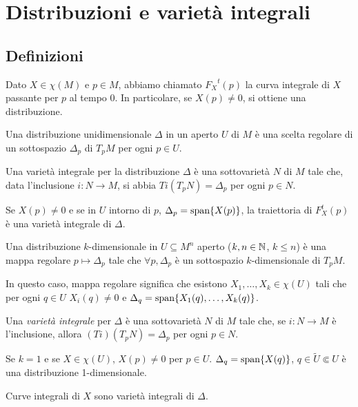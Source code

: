 \chapter{Distribuzioni e varietà integrali}


\section{Definizioni}

Dato $X\in\chi(M)$ e $p\in M$, abbiamo chiamato ${F_X}^t(p)$ la curva integrale di $X$ passante per $p$ al tempo $0$. In particolare, se $X(p)\neq 0$, si ottiene una distribuzione.

\begin{definition}
	Una distribuzione unidimensionale $\Delta$ in un aperto $U$ di $M$ è una scelta regolare di un sottospazio $\Delta_p$ di $T_pM$ per ogni $p\in U$.
\end{definition}

\begin{definition}
	Una varietà integrale per la distribuzione $\Delta$ è una sottovarietà $N$ di $M$ tale che, data l'inclusione $i:N\to M$, si abbia $Ti(T_pN)=\Delta_p$ per ogni $p\in N$.
\end{definition}

Se $X(p)\neq 0$ e se in $U$ intorno di $p$, $\Delta_p=\mathrm{span}\{X(p)\}$, la traiettoria di $F_X^t(p)$ è una varietà integrale di $\Delta$. 


\begin{definition}
	Una distribuzione $k$-dimensionale in $U\subseteq M^n$ aperto ($k,n\in\mathbb N$, $k\le n$) è una mappa regolare  $p\mapsto \Delta_p$ tale che $\forall p, \Delta_p$ è un sottospazio $k$-dimensionale di $T_pM$.
	
	In questo caso, mappa regolare significa che esistono $X_1,\ldots,X_k\in \chi(U)$ tali che per ogni $q\in U$ $X_i(q)\ne 0$ e $\Delta_q=\mathrm{span}\{X_1(q),\ldots,X_k(q)\}$.
\end{definition}

\begin{definition}
	Una \emph{varietà integrale} per $\Delta$ è una sottovarietà $N$ di $M$ tale che, se $i:N\to M$ è l'inclusione,
	allora $(Ti)(T_pN)=\Delta_p$ per ogni $p\in N$.
\end{definition}

\begin{example}
	Se $k=1$ e se $X\in\chi(U)$, $X(p)\ne 0$ per $p\in U$. $\Delta_q=\mathrm{span} \{X(q)\}$, $q\in\tilde U\Subset U$ è una distribuzione 1-dimensionale.
	
	Curve integrali di $X$ sono varietà integrali di $\Delta$.
\end{example}

